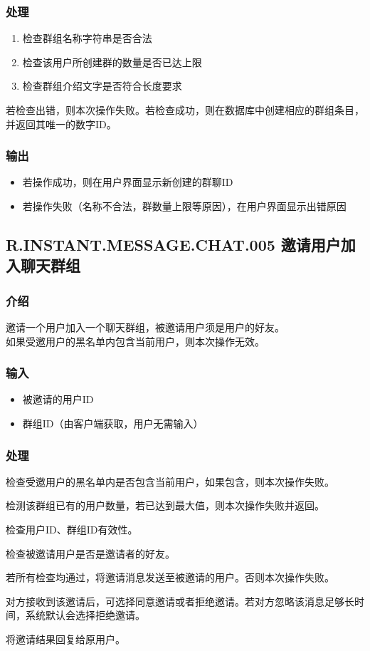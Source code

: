 \subsubsection{处理}
\begin{enumerate}
	\item 检查群组名称字符串是否合法
	\item 检查该用户所创建群的数量是否已达上限
	\item 检查群组介绍文字是否符合长度要求
\end{enumerate}
若检查出错，则本次操作失败。若检查成功，则在数据库中创建相应的群组条目，并返回其唯一的数字ID。
\subsubsection{输出}
\begin{itemize}
	\item 若操作成功，则在用户界面显示新创建的群聊ID
	\item 若操作失败（名称不合法，群数量上限等原因），在用户界面显示出错原因
\end{itemize}

\subsection{R.INSTANT.MESSAGE.CHAT.005 邀请用户加入聊天群组}
\subsubsection{介绍}
邀请一个用户加入一个聊天群组，被邀请用户须是用户的好友。\\
{
	\color{red}
	如果受邀用户的黑名单内包含当前用户，则本次操作无效。
}
\subsubsection{输入}
\begin{itemize}
	\item 被邀请的用户ID
	\item 群组ID（由客户端获取，用户无需输入）
\end{itemize}
\subsubsection{处理}
\begin{enumerate}
	{
	\color{red}
	\item 检查受邀用户的黑名单内是否包含当前用户，如果包含，则本次操作失败。
	}
	\item 检测该群组已有的用户数量，若已达到最大值，则本次操作失败并返回。
	\item 检查用户ID、群组ID有效性。
	\item 检查被邀请用户是否是邀请者的好友。
	\item 若所有检查均通过，将邀请消息发送至被邀请的用户。否则本次操作失败。
	\item 对方接收到该邀请后，可选择同意邀请或者拒绝邀请。若对方忽略该消息足够长时间，系统默认会选择拒绝邀请。
	\item 将邀请结果回复给原用户。
\end{enumerate}
